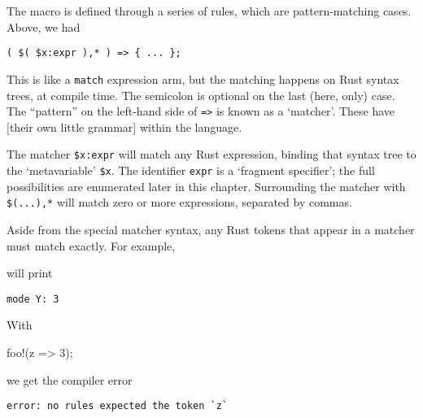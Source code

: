 \documentclass[a4paper,]{book}
\newenvironment{Shaded}{\begin{snugshade}}{\end{snugshade}}
\newcommand{\KeywordTok}[1]{\textcolor[rgb]{0.13,0.29,0.53}{\textbf{{#1}}}}
\newcommand{\DecValTok}[1]{\textcolor[rgb]{0.00,0.00,0.81}{{#1}}}
\newcommand{\StringTok}[1]{\textcolor[rgb]{0.31,0.60,0.02}{{#1}}}
\newcommand{\OtherTok}[1]{\textcolor[rgb]{0.56,0.35,0.01}{{#1}}}
\newcommand{\NormalTok}[1]{{#1}}
\begin{document}
The macro is defined through a series of rules, which are
pattern-matching cases. Above, we had

\begin{verbatim}
( $( $x:expr ),* ) => { ... };
\end{verbatim}

This is like a \texttt{match} expression arm, but the matching happens
on Rust syntax trees, at compile time. The semicolon is optional on the
last (here, only) case. The ``pattern'' on the left-hand side of
\texttt{=\textgreater{}} is known as a `matcher'. These have {[}their
own little grammar{]} within the language.

The matcher \texttt{\$x:expr} will match any Rust expression, binding
that syntax tree to the `metavariable' \texttt{\$x}. The identifier
\texttt{expr} is a `fragment specifier'; the full possibilities are
enumerated later in this chapter. Surrounding the matcher with
\texttt{\$(...),*} will match zero or more expressions, separated by
commas.

Aside from the special matcher syntax, any Rust tokens that appear in a
matcher must match exactly. For example,

\begin{Shaded}
\end{Shaded}

will print

\begin{verbatim}
mode Y: 3
\end{verbatim}

With

\begin{Shaded}
\begin{Highlighting}[]
\OtherTok{foo!}\NormalTok{(z => }\DecValTok{3}\NormalTok{);}
\end{Highlighting}
\end{Shaded}

we get the compiler error

\begin{verbatim}
error: no rules expected the token `z`
\end{verbatim}
\end{document}
